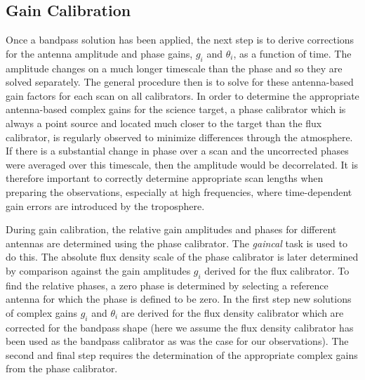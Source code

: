 \subsection{Gain Calibration}

Once a bandpass solution has been applied, the next step is to derive corrections for the antenna amplitude and phase gains, $g_{i}$ and $\theta _{i}$, as a function of time. The amplitude changes on a much longer timescale than the phase and so they are solved separately. The general procedure then is to solve for these antenna-based gain factors for each scan on all calibrators. In order to determine the appropriate antenna-based complex gains for the science target, a phase calibrator which is always a point source and located much closer to the target than the flux calibrator, is regularly observed to minimize differences through the atmosphere. If there is a substantial change in phase over a scan and the uncorrected phases were averaged over this timescale, then the amplitude would be decorrelated. It is therefore important to correctly determine appropriate scan lengths when preparing the observations, especially at high frequencies, where  time-dependent gain errors are introduced by the troposphere.

During gain calibration, the relative gain amplitudes and phases for different antennas are determined using the phase calibrator. The \textit{gaincal} task is used to do this. The absolute flux density scale of the phase calibrator is later determined by comparison against the gain amplitudes $g_{i}$ derived for the flux calibrator. To find the relative phases, a zero phase is determined by selecting a reference antenna for which the phase is defined to be zero. In the first step new solutions of complex gains $g_{i}$ and $\theta _{i}$ are derived for the flux density calibrator which are corrected for the bandpass shape (here we assume the flux density calibrator has been used as the bandpass calibrator as was the case for our observations). The second and final step requires the determination of the appropriate complex gains from the phase calibrator.

